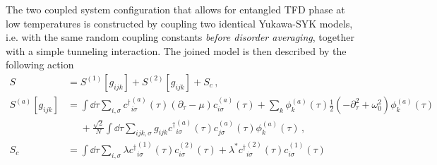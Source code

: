The two coupled system configuration that allows for entangled TFD phase at low temperatures is constructed by coupling two identical Yukawa-SYK models, i.e. with the same random coupling constants {\em before disorder averaging}, together with a simple tunneling interaction.
The joined model is then described by the following action
\begin{align}
    S &= S^{(1)}[g_{ijk}] + S^{(2)}[g_{ijk}] + S_c \, , \nonumber \\
    S^{(a)}[g_{ijk}]&= \int \!\dd\tau \sum_{i,\sigma} {c^\dagger}^{(a)}_{i\sigma}(\tau) \left(\partial_\tau - \mu\right)c^{(a)}_{i\sigma}(\tau) + \sum_k \phi^{(a)}_k(\tau)\frac{1}{2}\left(-\partial_\tau^2 + \omega_0^2\right) \phi^{(a)}_k(\tau) \nonumber\\
     &~~~~~~+ \frac{\sqrt{2}}{N}\int\!\dd\tau \sum_{ijk,\sigma} g_{ijk}{c^\dagger}^{(a)}_{i\sigma}(\tau)c^{(a)}_{j\sigma}(\tau)\phi^{(a)}_k(\tau) \, ,\nonumber\\
    S_c &= \int \!\dd\tau \sum_{i,\sigma}\lambda {c^\dagger}^{(1)}_{i\sigma}(\tau)c^{(2)}_{i\sigma}(\tau) + \lambda^* {c^\dagger}^{(2)}_{i\sigma}(\tau)c^{(1)}_{i\sigma}(\tau) 
    \label{eq:bareaction}
\end{align}
%
